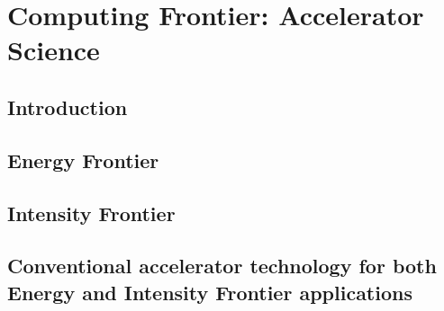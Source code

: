  
\chapter{Computing Frontier: Accelerator Science}
\label{chap:mag}


\begin{center}\begin{boldmath}



\end{boldmath}\end{center}


\section{Introduction}
\label{sec:acc-sc-intro}



\section{Energy Frontier}
\label{sec:acc-sc-ef}






\section{Intensity Frontier}
\label{sec:acc-sc-if}


\section{Conventional accelerator technology for both Energy and Intensity Frontier applications}
\label{sec:acc-sc-all}


